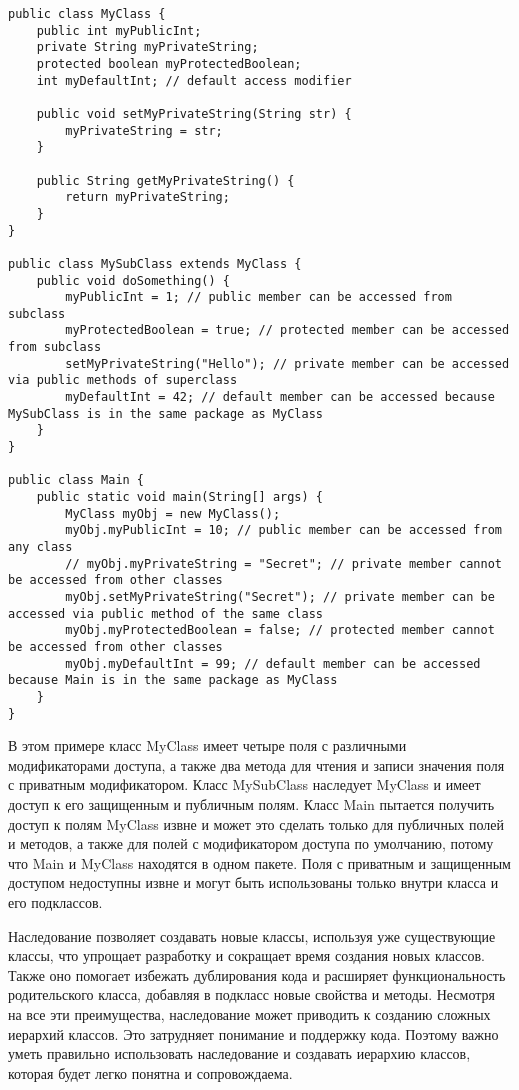 \documentclass[12pt, a4paper]{book}%
\begin{document}
{\begin{lstlisting}
public class MyClass {
    public int myPublicInt;
    private String myPrivateString;
    protected boolean myProtectedBoolean;
    int myDefaultInt; // default access modifier

    public void setMyPrivateString(String str) {
        myPrivateString = str;
    }

    public String getMyPrivateString() {
        return myPrivateString;
    }
}

public class MySubClass extends MyClass {
    public void doSomething() {
        myPublicInt = 1; // public member can be accessed from subclass
        myProtectedBoolean = true; // protected member can be accessed from subclass
        setMyPrivateString("Hello"); // private member can be accessed via public methods of superclass
        myDefaultInt = 42; // default member can be accessed because MySubClass is in the same package as MyClass
    }
}

public class Main {
    public static void main(String[] args) {
        MyClass myObj = new MyClass();
        myObj.myPublicInt = 10; // public member can be accessed from any class
        // myObj.myPrivateString = "Secret"; // private member cannot be accessed from other classes
        myObj.setMyPrivateString("Secret"); // private member can be accessed via public method of the same class
        myObj.myProtectedBoolean = false; // protected member cannot be accessed from other classes
        myObj.myDefaultInt = 99; // default member can be accessed because Main is in the same package as MyClass
    }
}

\end{lstlisting}

В этом примере класс MyClass имеет четыре поля с различными модификаторами доступа, а также два метода для чтения и записи значения поля с приватным модификатором. Класс MySubClass наследует MyClass и имеет доступ к его защищенным и публичным полям. Класс Main пытается получить доступ к полям MyClass извне и может это сделать только для публичных полей и методов, а также для полей с модификатором доступа по умолчанию, потому что Main и MyClass находятся в одном пакете. Поля с приватным и защищенным доступом недоступны извне и могут быть использованы только внутри класса и его подклассов.

Наследование позволяет создавать новые классы, используя уже существующие классы, что упрощает разработку и сокращает время создания новых классов. Также оно помогает избежать дублирования кода и расширяет функциональность родительского класса, добавляя в подкласс новые свойства и методы. Несмотря на все эти преимущества, наследование может приводить к созданию сложных иерархий классов. Это затрудняет понимание и поддержку кода. Поэтому важно уметь правильно использовать наследование и создавать иерархию классов, которая будет легко понятна и сопровождаема.

}
\end{document}
